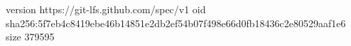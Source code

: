version https://git-lfs.github.com/spec/v1
oid sha256:5f7eb4c8419ebe46b14851e2db2ef54b07f498e66d0fb18436c2e80529aaf1e6
size 379595
